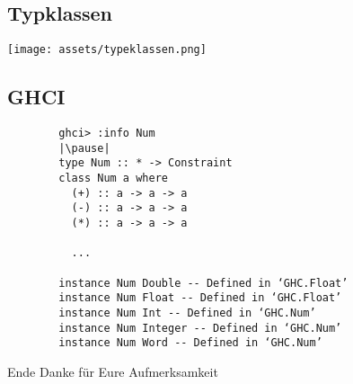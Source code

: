 \documentclass[
	aspectratio=169, 
	10pt 
]{beamer}
\begin{document}
\subsection{Typklassen}
\begin{frame}{\insertsubsection}
	\texttt{[image: assets/typeklassen.png]}
\end{frame}


\subsection{GHCI}
\begin{frame}[fragile]{\insertsubsection}
	\begin{verbatim}
		ghci> :info Num
		|\pause|
		type Num :: * -> Constraint
		class Num a where
		  (+) :: a -> a -> a
		  (-) :: a -> a -> a
		  (*) :: a -> a -> a
		
		  ...
		 
		instance Num Double -- Defined in ‘GHC.Float’
		instance Num Float -- Defined in ‘GHC.Float’
		instance Num Int -- Defined in ‘GHC.Num’
		instance Num Integer -- Defined in ‘GHC.Num’
		instance Num Word -- Defined in ‘GHC.Num’
	\end{verbatim}
\end{frame}



\begin{frame}{Ende}
	\center Danke für Eure Aufmerksamkeit
\end{frame}
\end{document}
